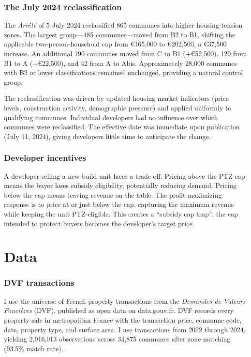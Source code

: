 \documentclass[12pt]{article}
\begin{document}
\subsubsection*{The July 2024 reclassification} The \textit{Arr\^{e}t\'{e}} of 5 July 2024 reclassified 865 communes into higher housing-tension zones. The largest group---485 communes---moved from B2 to B1, shifting the applicable two-person-household cap from \euro165,000 to \euro202,500, a \euro37,500 increase. An additional 190 communes moved from C to B1 (+\euro52,500), 129 from B1 to A (+\euro22,500), and 42 from A to Abis. Approximately 28,000 communes with B2 or lower classifications remained unchanged, providing a natural control group.

The reclassification was driven by updated housing market indicators (price levels, construction activity, demographic pressure) and applied uniformly to qualifying communes. Individual developers had no influence over which communes were reclassified. The effective date was immediate upon publication (July 11, 2024), giving developers little time to anticipate the change.

\subsubsection*{Developer incentives} A developer selling a new-build unit faces a trade-off. Pricing above the PTZ cap means the buyer loses subsidy eligibility, potentially reducing demand. Pricing below the cap means leaving revenue on the table. The profit-maximizing response is to price at or just below the cap, capturing the maximum revenue while keeping the unit PTZ-eligible. This creates a ``subsidy cap trap'': the cap intended to protect buyers becomes the developer's target price.

\section{Data}
\label{sec:data}

\subsubsection*{DVF transactions} I use the universe of French property transactions from the \textit{Demandes de Valeurs Fonci\`{e}res} (DVF), published as open data on data.gouv.fr. DVF records every property sale in metropolitan France with the transaction price, commune code, date, property type, and surface area. I use transactions from 2022 through 2024, yielding 2,916,013 observations across 34,875 communes after zone matching (93.5\% match rate).
\end{document}

